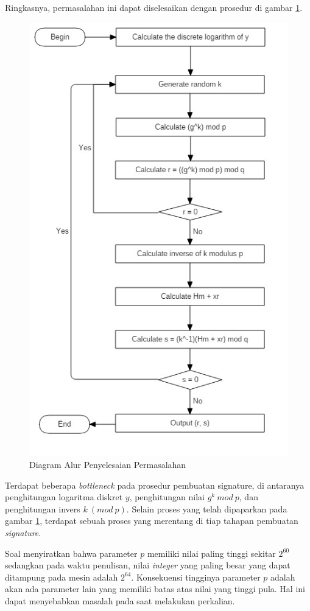 Ringkasnya, permasalahan ini dapat diselesaikan dengan prosedur di gambar \ref{fig:main_diagram}.
\begin{figure}
	\Centering
	\includegraphics [scale=0.5]{bab2/img/main-diagram}
	\caption {Diagram Alur Penyelesaian Permasalahan}
	\label {fig:main_diagram}
\end{figure}
Terdapat beberapa \textit{bottleneck} pada prosedur pembuatan signature, di antaranya penghitungan logaritma diskret $ y $, penghitungan nilai $g^k\ mod\ p$, dan penghitungan invers $k\ \left(mod\ p\right)$. Selain proses yang telah dipaparkan pada gambar \ref{fig:main_diagram}, terdapat sebuah proses yang merentang di tiap tahapan pembuatan \textit{signature}.

Soal menyiratkan bahwa parameter $p$ memiliki nilai paling tinggi sekitar $2^{60}$ sedangkan pada waktu penulisan, nilai \textit{integer} yang paling besar yang dapat ditampung pada mesin adalah $2^{64}$. Konsekuensi tingginya parameter $p$ adalah akan ada parameter lain yang memiliki batas atas nilai yang tinggi pula. Hal ini dapat menyebabkan masalah pada saat melakukan perkalian.

